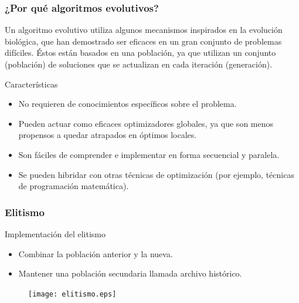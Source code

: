 \documentclass[10pt,compress]{beamer}
\begin{document}
\begin{frame}
\frametitle{¿Por qu\'e algoritmos evolutivos?}
Un algoritmo evolutivo utiliza algunos mecanismos inspirados en la evoluci\'on biol\'ogica, que han demostrado ser eficaces en un gran conjunto de problemas dif\'iciles. 
\'Estos est\'an basados ​​en una poblaci\'on, ya que utilizan un conjunto (poblaci\'on) de soluciones que se actualizan en cada iteraci\'on (generaci\'on).
	\begin{block}{Caracter\'isticas}
	  \begin{itemize}
			\item No requieren de conocimientos espec\'ificos sobre el problema.
			\item Pueden actuar como eficaces optimizadores globales, ya que son menos propensos a quedar atrapados en 
						\'optimos locales.
			\item Son f\'aciles de comprender e implementar en forma secuencial y paralela.
			\item Se pueden hibridar con otras t\'ecnicas de optimizaci\'on (por ejemplo, t\'ecnicas de programaci\'on 
						matem\'atica).
	  \end{itemize}
	\end{block}
\end{frame}
\begin{frame}
	\frametitle{Elitismo}	
	\begin{block}{Implementaci\'on del elitismo }
		\begin{itemize}
   \item Combinar la poblaci\'on anterior y la nueva.
   \item Mantener una poblaci\'on secundaria llamada archivo hist\'orico.   
  \end{itemize}
  \end{block}
	
	  \begin{figure}[H]
	\centering
	\texttt{[image: elitismo.eps]}
     
      \end{figure}
	
\end{frame}
\end{document}
